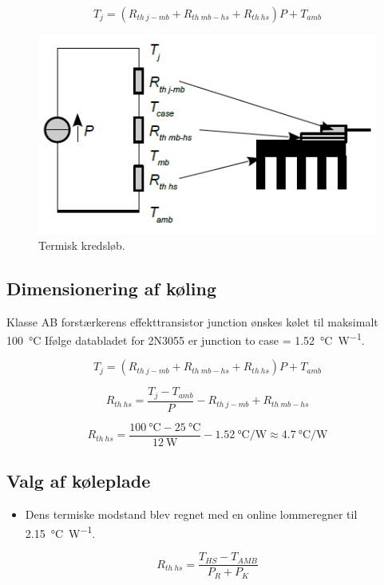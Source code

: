 \documentclass[danish]{article}
\begin{document}
\begin{equation}
T_j = (R_{th\:j-mb} + R_{th\: mb-hs} + R_{th\: hs})P + T_{amb}
\end{equation}

\begin{figure} [H]
	\centering
	\includegraphics[width=0.5\linewidth]{graphics/termiskdesign}
	\caption{Termisk kredsløb.}
	\label{fig:termiskdesign}
\end{figure}

\subsection{Dimensionering af køling}
Klasse AB forstærkerens effekttransistor junction ønskes kølet til maksimalt \SI{100}{\degreeCelsius}
Ifølge databladet for 2N3055 er junction to case = \SI{1.52}{\degreeCelsius\per\watt}.

\begin{equation}
T_j = (R_{th\:j-mb} + R_{th\: mb-hs} + R_{th\: hs})P + T_{amb}
\end{equation}

\begin{equation}
R_{th\: hs} = \dfrac{T_j-T_{amb}}{P}-R_{th\:j-mb} + R_{th\: mb-hs}
\end{equation}

\begin{equation}
R_{th\: hs} = \dfrac{\SI{100}{\degreeCelsius}-\SI{25}{\degreeCelsius}}{\SI{12}{\watt}}-\SI{1.52}{\degreeCelsius\per\watt} \approx \SI{4,7}{\degreeCelsius\per\watt}
\end{equation}

\subsection{Valg af køleplade}
\begin{itemize}
	\item Dens termiske modstand blev regnet med en online lommeregner til \SI{2.15}{\degreeCelsius\per\watt}.
\end{itemize}

\begin{equation}
R_{th\: hs} = \dfrac{T_{HS}-T_{AMB}}{P_R+P_K}
\end{equation}
\end{document}

